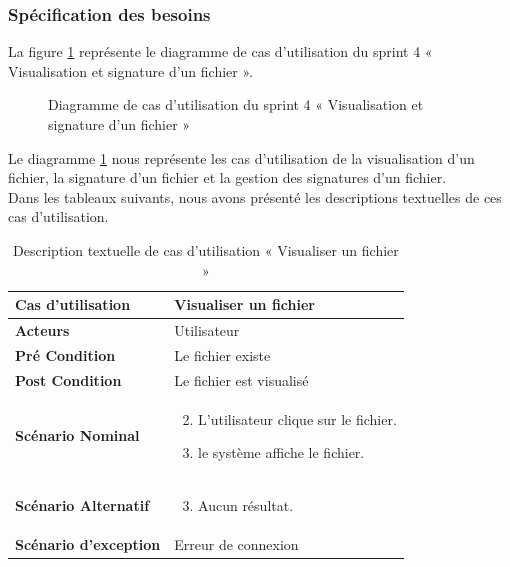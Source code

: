 \subsubsection{Spécification des besoins}
La figure \ref{fig:UseCaseDiagram4} représente le diagramme de cas d'utilisation du sprint 4 « Visualisation et signature d'un fichier ».
\begin{figure}[H]
  \centering
  \caption{Diagramme de cas d'utilisation du sprint 4 « Visualisation et signature d'un fichier »}
  \label{fig:UseCaseDiagram4}
\end{figure}
Le diagramme \ref{fig:UseCaseDiagram4} nous représente les cas d'utilisation de la visualisation d'un fichier, la signature d'un fichier et la gestion des signatures d'un fichier.\\

Dans les tableaux suivants, nous avons présenté les descriptions textuelles de ces cas d'utilisation.
\begin{longtable}{|p{5cm}|p{10cm}|}
  \caption{Description textuelle de cas d'utilisation « Visualiser un fichier  »} \label{tab:description-textuelle-de-cas-d-utilisation-visualiser-un-fichier} \\
\hline
\textbf{Cas d'utilisation}&Visualiser un fichier\\
\hline
\textbf{Acteurs}&Utilisateur\\
\hline
\textbf{Pré Condition}&Le fichier existe\\
\hline
\textbf{Post Condition}&Le fichier est visualisé\\
\hline
\textbf{Scénario Nominal}&
\vspace{-\baselineskip}
\begin{enumerate}
    \setcounter{enumi}{1}
  \item L'utilisateur clique sur le fichier.
  \item le système affiche le fichier.
\end{enumerate}\\
\hline
\textbf{Scénario Alternatif}&
\vspace{-\baselineskip}
\begin{enumerate}
    \setcounter{enumi}{2}
    \item Aucun résultat.
\end{enumerate}\\
\hline
\textbf{Scénario d'exception}&Erreur de connexion\\
\hline


\end{longtable}

